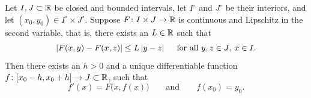 \begin{thm}%
Let $I, J \subset {\mathbb{R}}$ be closed and bounded intervals,
let $I^\circ$ and $J^\circ$ be their interiors, and 
let $(x_0,y_0) \in I^\circ \times J^\circ$.
Suppose $F \colon I \times J \to {\mathbb{R}}$ is continuous
and Lipschitz in the second variable, that is, there exists
an $L \in {\mathbb{R}}$ such that
\begin{equation*}
\left\lvert {F(x,y) - F(x,z)} \right\rvert \leq L \left\lvert {y-z} \right\rvert
\ \ \ \text{ for all $y,z \in J$, $x \in I$} .
\end{equation*}
Then there exists an $h > 0$ and a unique differentiable
function $f \colon [x_0 - h, x_0 + h] \to J \subset {\mathbb{R}}$, such that
\begin{equation*}
f'(x) = F\bigl(x,f(x)\bigr) \qquad \text{and} \qquad f(x_0) = y_0.
\end{equation*}
\end{thm}

